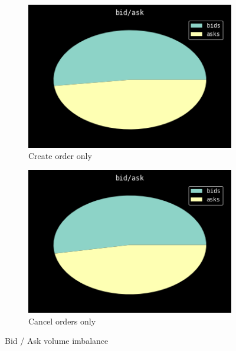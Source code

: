 \begin{figure}[H]
\begin{subfigure}[b]{0.45\textwidth}
        \includegraphics[width=\textwidth]{images/ob-ba-pie-created}
        \caption{Create order only}
        \label{fig:data-imbalance-creates}
    \end{subfigure}
    \begin{subfigure}[b]{0.45\textwidth}
        \includegraphics[width=\textwidth]{images/ob-ba-pie-cancelled}
        \caption{Cancel orders only}
        \label{fig:data-imbalance-cancels}
    \end{subfigure}
    \caption{Bid / Ask volume imbalance}\label{fig:data-imbalance}
\end{figure}

